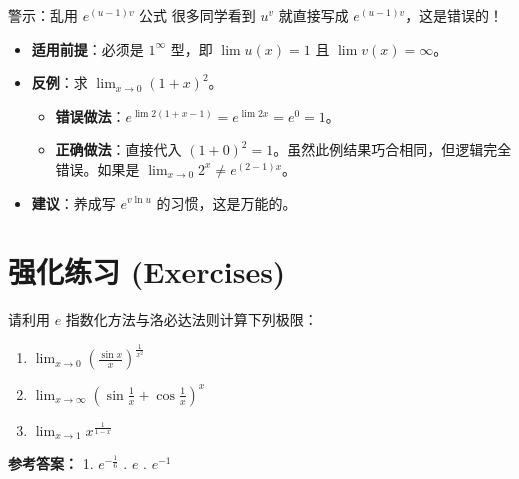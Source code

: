 \documentclass[12pt, a4paper]{article}
\begin{document}
\begin{alertbox}{警示：乱用 $e^{(u-1)v}$ 公式}
很多同学看到 $u^v$ 就直接写成 $e^{(u-1)v}$，这是错误的！
\begin{itemize}
    \item \textbf{适用前提}：必须是 $1^\infty$ 型，即 $\lim u(x) = 1$ 且 $\lim v(x) = \infty$。
    \item \textbf{反例}：求 $\lim_{x \to 0} (1+x)^2$。
    \begin{itemize}
        \item \textbf{错误做法}：$e^{\lim 2(1+x-1)} = e^{\lim 2x} = e^0 = 1$。
        \item \textbf{正确做法}：直接代入 $(1+0)^2 = 1$。虽然此例结果巧合相同，但逻辑完全错误。如果是 $\lim_{x \to 0} 2^x \neq e^{(2-1)x}$。
    \end{itemize}
    \item \textbf{建议}：养成写 $e^{v \ln u}$ 的习惯，这是万能的。
\end{itemize}
\end{alertbox}

\section{强化练习 (Exercises)}

请利用 $e$ 指数化方法与洛必达法则计算下列极限：
\begin{enumerate}
    \item $\displaystyle \lim_{x \to 0} \left( \frac{\sin x}{x} \right)^{\frac{1}{x^2}}$
    \item $\displaystyle \lim_{x \to \infty} \left( \sin \frac{1}{x} + \cos \frac{1}{x} \right)^x$
    \item $\displaystyle \lim_{x \to 1} x^{\frac{1}{1-x}}$
\end{enumerate}

\vspace{1em}
\noindent\textbf{参考答案：} 
1. $e^{-\frac{1}{6}}$ . $e$ . $e^{-1}$
\end{document}

